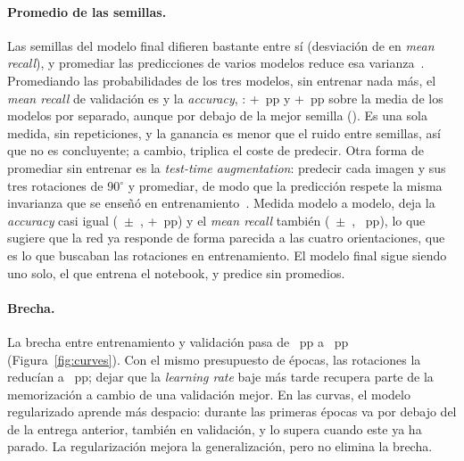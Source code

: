 \begin{table}[h]
  \centering\small
  \caption{Modelo de la entrega anterior frente al regularizado (validación; media $\pm$ desviación típica de
   semillas).}
  \label{tab:final}
\end{table}

\paragraph{Promedio de las  semillas.} Las  semillas del modelo final difieren
bastante entre sí (desviación de  en \emph{mean recall}), y promediar las predicciones de
varios modelos reduce esa varianza~\cite{goodfellow}. Promediando las probabilidades de los tres modelos, sin entrenar
nada más, el \emph{mean recall} de validación es  y la \emph{accuracy}, :
+~pp y +~pp sobre la media de los modelos por separado, aunque por debajo de la mejor
semilla (). Es una sola medida, sin repeticiones, y la ganancia es menor que el ruido
entre semillas, así que no es concluyente; a cambio, triplica el coste de predecir. Otra forma de promediar sin entrenar es
la \emph{test-time augmentation}: predecir cada imagen y sus tres rotaciones de 90$^\circ$ y promediar, de modo que la
predicción respete la misma invarianza que se enseñó en entrenamiento~\cite{krizhevsky}. Medida modelo a modelo, deja la
\emph{accuracy} casi igual (~$\pm$~, +~pp) y el
\emph{mean recall} también (~$\pm$~, ~pp), lo que sugiere que la
red ya responde de forma parecida a las cuatro orientaciones, que es lo que buscaban las rotaciones en
entrenamiento. El modelo final
sigue siendo uno solo, el que entrena el notebook, y predice sin promedios.

\paragraph{Brecha.} La brecha entre entrenamiento y validación pasa de ~pp a
~pp (Figura~\ref{fig:curves}). Con el mismo presupuesto de épocas, las rotaciones la reducían a
~pp; dejar que la \emph{learning rate} baje más tarde recupera parte de la memorización a cambio de una validación mejor. En las
curvas, el modelo regularizado aprende más despacio: durante las primeras épocas va por debajo del de la entrega
anterior, también en validación, y lo supera cuando este ya ha parado. La regularización mejora la generalización,
pero no elimina la brecha.

